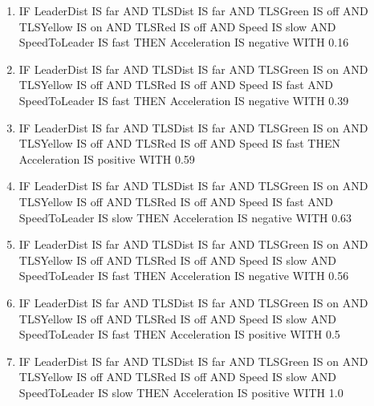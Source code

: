 \begin{enumerate}
	\item IF LeaderDist IS far AND TLSDist IS far AND TLSGreen IS off AND TLSYellow IS on AND TLSRed IS off AND Speed IS slow AND SpeedToLeader IS fast THEN Acceleration IS negative WITH 0.16
	\item IF LeaderDist IS far AND TLSDist IS far AND TLSGreen IS on AND TLSYellow IS off AND TLSRed IS off AND Speed IS fast AND SpeedToLeader IS fast THEN Acceleration IS negative WITH 0.39
	\item IF LeaderDist IS far AND TLSDist IS far AND TLSGreen IS on AND TLSYellow IS off AND TLSRed IS off AND Speed IS fast THEN Acceleration IS positive WITH 0.59
	\item IF LeaderDist IS far AND TLSDist IS far AND TLSGreen IS on AND TLSYellow IS off AND TLSRed IS off AND Speed IS fast AND SpeedToLeader IS slow THEN Acceleration IS negative WITH 0.63
	\item IF LeaderDist IS far AND TLSDist IS far AND TLSGreen IS on AND TLSYellow IS off AND TLSRed IS off AND Speed IS slow AND SpeedToLeader IS fast THEN Acceleration IS negative WITH 0.56
	\item IF LeaderDist IS far AND TLSDist IS far AND TLSGreen IS on AND TLSYellow IS off AND TLSRed IS off AND Speed IS slow AND SpeedToLeader IS fast THEN Acceleration IS positive WITH 0.5
	\item IF LeaderDist IS far AND TLSDist IS far AND TLSGreen IS on AND TLSYellow IS off AND TLSRed IS off AND Speed IS slow AND SpeedToLeader IS slow THEN Acceleration IS positive WITH 1.0
\end{enumerate}
